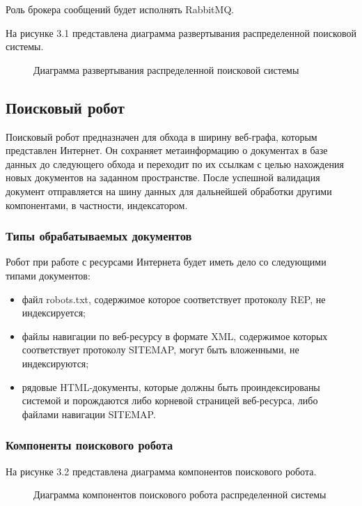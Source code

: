 Роль брокера сообщений будет исполнять RabbitMQ.

На рисунке 3.1 представлена диаграмма развертывания распределенной поисковой системы.

\begin{figure}
\caption{Диаграмма развертывания распределенной поисковой системы}
\label{diagram_deployment:image}
\end{figure}

\subsection{Поисковый робот}

Поисковый робот предназначен для обхода в ширину веб-графа, которым представлен Интернет. Он сохраняет метаинформацию о документах в базе данных до следующего обхода и переходит по их ссылкам с целью нахождения новых документов на заданном пространстве. После успешной валидация документ отправляется на шину данных для дальнейшей обработки другими компонентами, в частности, индексатором. 

\subsubsection{Типы обрабатываемых документов}
Робот при работе с ресурсами Интернета будет иметь дело со следующими типами документов:
\begin{itemize}
\item файл robots.txt, содержимое которое соответствует протоколу REP, не индексируется;
\item файлы навигации по веб-ресурсу в формате XML, содержимое которых соответствует протоколу SITEMAP, могут быть вложенными, не индексируются;
\item рядовые HTML-документы, которые должны быть проиндексированы системой и порождаются либо корневой страницей веб-ресурса, либо файлами навигации SITEMAP.
\end{itemize}

\subsubsection{Компоненты поискового робота}

На рисунке 3.2 представлена диаграмма компонентов поискового робота.

\begin{figure}
\caption{Диаграмма компонентов поискового робота распределенной системы}
\label{robot/diagram_components:image}
\end{figure}

